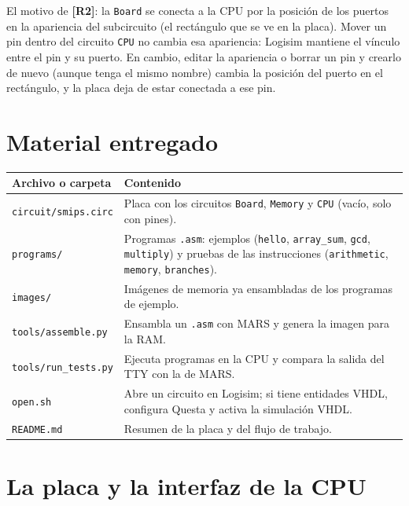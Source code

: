 \documentclass[11pt,a4paper]{article}
\newcommand{\sig}[1]{\texttt{#1}}
\newcommand{\req}[1]{\textbf{[#1]}}
\begin{document}
\noindent El motivo de \req{R2}: la \sig{Board} se conecta a la CPU por la posición de los puertos en la apariencia del subcircuito (el rectángulo que se ve en la placa). Mover un pin dentro del circuito \sig{CPU} no cambia esa apariencia: Logisim mantiene el vínculo entre el pin y su puerto. En cambio, editar la apariencia o borrar un pin y crearlo de nuevo (aunque tenga el mismo nombre) cambia la posición del puerto en el rectángulo, y la placa deja de estar conectada a ese pin.

\section{Material entregado}

\begin{center}
\begin{tabularx}{\linewidth}{@{}lX@{}}
\toprule
Archivo o carpeta & Contenido \\
\midrule
\sig{circuit/smips.circ} & Placa con los circuitos \sig{Board}, \sig{Memory} y \sig{CPU} (vacío, solo con pines). \\
\sig{programs/} & Programas \sig{.asm}: ejemplos (\sig{hello}, \sig{array\_sum}, \sig{gcd}, \sig{multiply}) y pruebas de las instrucciones (\sig{arithmetic}, \sig{memory}, \sig{branches}). \\
\sig{images/} & Imágenes de memoria ya ensambladas de los programas de ejemplo. \\
\sig{tools/assemble.py} & Ensambla un \sig{.asm} con MARS y genera la imagen para la RAM. \\
\sig{tools/run\_tests.py} & Ejecuta programas en la CPU y compara la salida del TTY con la de MARS. \\
\sig{open.sh} & Abre un circuito en Logisim; si tiene entidades VHDL, configura Questa y activa la simulación VHDL. \\
\sig{README.md} & Resumen de la placa y del flujo de trabajo. \\
\bottomrule
\end{tabularx}
\end{center}

\section{La placa y la interfaz de la CPU}\label{sec:placa}
\end{document}
